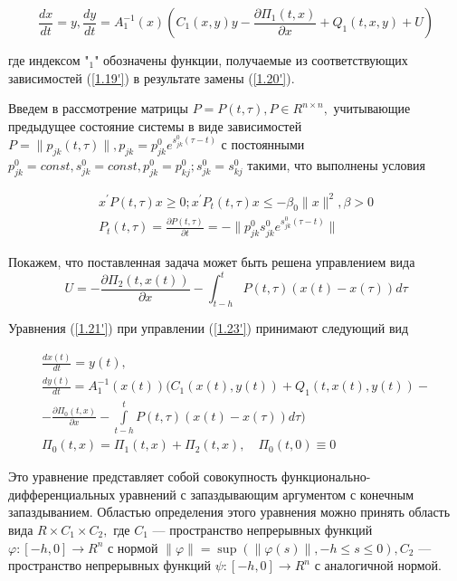 \begin{equation} \label{1.21'}
\frac{dx}{dt} = y, \frac{dy}{dt} = A^{-1}_1(x) (C_1(x, y) y - \frac{\partial \Pi_1 (t, x)}{\partial x} + Q_1 (t, x, y) + U)
\end{equation}

где индексом "$_1$" обозначены функции, получаемые из соответствующих зависимостей (\ref{1.19'}) в результате замены (\ref{1.20'}).

Введем в рассмотрение матрицы $P = P(t, \tau), P \in R^{n \times n},$ учитывающие предыдущее состояние системы в виде зависимостей $P = \| p_{jk} (t, \tau) \|, p_{jk} = p_{jk}^0 e^{s_{jk}^0 (\tau - t)}$ с постоянными $p_{jk}^0 = const, s_{jk}^0 = const, p_{jk}^0 = p_{kj}^0; s_{jk}^0 = s_{kj}^0$ такими, что выполнены условия


\begin{equation} \label{1.22'}
	\begin{array}{c}
		x^{'} P (t, \tau) x \ge 0; x^{'} P_t (t, \tau) x \le - \beta_0 \| x \|^2, \beta > 0\\
		P_t(t, \tau) = \frac{\partial P (t, \tau)}{\partial t} = - \| p_{jk}^0 s_{jk}^{0} e^{s_{jk}^0 (\tau - t)} \|
	\end{array}
\end{equation}

Покажем, что поставленная задача может быть решена управлением вида
\begin{equation} \label{1.23'}
U = - \frac{\partial \Pi_2 (t, x(t))}{\partial x} - \int_{t - h}^{t} P(t, \tau) (x(t) - x(\tau)) d \tau
\end{equation}

Уравнения (\ref{1.21'}) при управлении (\ref{1.23'}) принимают следующий вид

\begin{equation} \label{1.24'}
\begin{array}{c}
\frac{d x(t)}{dt}=y(t),\\
\frac{d y(t)}{dt} = A_1^{-1} (x(t)) (C_1(x(t), y(t)) + Q_1(t, x(t), y(t)) -\\- \frac{\partial \Pi_0 (t, x)}{\partial x} - \int \limits_{t - h}^{t} P(t, \tau) (x(t) - x(\tau)) d \tau)\\
\Pi_0 (t, x) = \Pi_1(t, x) + \Pi_2 (t, x), \quad \Pi_0 (t, 0) \equiv 0
\end{array}
\end{equation}

Это уравнение представляет собой совокупность функционально-дифференциальных уравнений с запаздывающим аргументом с конечным запаздыванием. Областью определения этого уравнения можно принять область вида $R \times C_1 \times C_2,$ где $C_1$ --- пространство непрерывных функций $\varphi : [-h, 0] \to R^n$ с нормой $\| \varphi \| = \sup (\| \varphi(s) \|, -h \le s \le 0), C_2$ --- пространство непрерывных функций $\psi : [-h, 0] \to R^n$ с аналогичной нормой.

